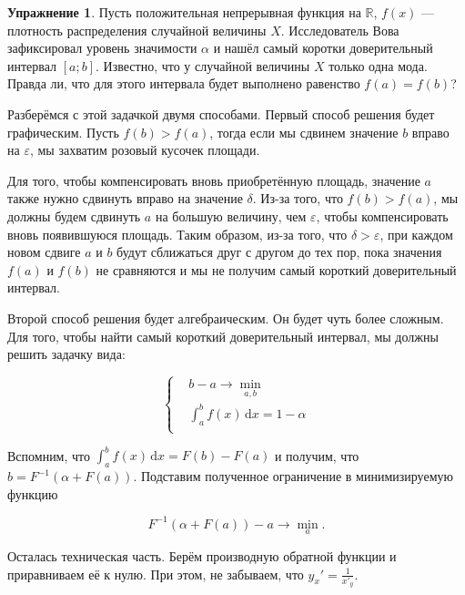\documentclass[12pt, a4paper, oneside]{extreport}
\def \mbb{\mathbb}
\def \RR{\mbb R}
\newcommand{\dx}[1]{\,\mathrm{d}#1} %
\theoremstyle{plain}              %
\theoremstyle{definition}         %
\newtheorem{problem}{\color{myblue} Упражнение}
\begin{document}
\begin{problem}\label{upr_conf}
Пусть положительная непрерывная функция на $\RR$, $f(x)$ --- плотность распределения случайной величины $X$. Исследователь Вова зафиксировал уровень значимости $\alpha$ и нашёл самый коротки доверительный интервал $[a;b]$. Известно, что у случайной величины $X$ только одна мода. Правда ли, что для этого интервала будет выполнено равенство $f(a) = f(b)$? 
\begin{sol}
Разберёмся с этой задачкой двумя способами. Первый способ решения будет графическим. Пусть $f(b) > f(a)$, тогда если мы сдвинем значение $b$ вправо на $\varepsilon$, мы захватим розовый кусочек площади. 


Для того, чтобы компенсировать вновь приобретённую площадь, значение $a$ также нужно сдвинуть вправо на значение $\delta$. Из-за того, что $f(b) > f(a)$, мы должны будем сдвинуть $a$ на большую величину, чем $\varepsilon$, чтобы компенсировать вновь появившуюся площадь. Таким образом, из-за того, что $\delta > \varepsilon$, при каждом новом сдвиге $a$ и $b$ будут сближаться друг с другом до тех пор, пока значения $f(a)$ и $f(b)$ не сравняются и мы не получим самый короткий доверительный интервал. 


Второй способ решения будет алгебраическим. Он будет чуть более сложным. Для того, чтобы найти самый короткий доверительный интервал, мы должны решить задачку вида: 

\begin{equation*}
\left \{
\begin{aligned}
&b - a \longrightarrow \min_{a,b}  \\
&\int_a^b f(x) \dx{x} = 1 - \alpha \\
\end{aligned}
\right.
\end{equation*}

Вспомним, что $\int_a^b f(x) \dx{x} = F(b) - F(a)$ и получим, что $b = F^{-1}(\alpha + F(a))$. Подставим полученное ограничение в минимизируемую функцию

\[ F^{-1}(\alpha + F(a)) - a \to \min_a.\]

Осталась техническая часть. Берём производную обратной функции и приравниваем её к нулю. При этом, не забываем, что $y_x' = \frac{1}{x'_y}$.


\end{sol}
\end{problem}
\end{document}
